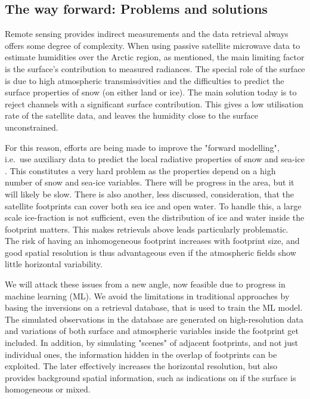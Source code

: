 \documentclass[12pt,oneside,a4paper]{article}
\begin{document}
\subsection{The way forward: Problems and solutions }


Remote sensing provides indirect measurements and the data retrieval always offers some degree of complexity. When using passive satellite microwave data to estimate humidities over the Arctic region, as mentioned, the main limiting factor is the surface's contribution to measured radiances. The special role of the surface is due to high atmospheric transmissivities and the difficulties to predict the surface properties of snow (on either land or ice).
The main solution today is to reject channels with a significant surface
contribution. This gives a low utilisation rate of the satellite data, and
leaves the humidity close to the surface unconstrained.

For this reason, efforts are being made to improve the "forward modelling",
i.e.\ use auxiliary data to predict the local radiative properties of snow and
sea-ice \citep[e.g.][]{tonboe:2010:thesi}. This constitutes a very hard problem
as the properties depend on a high number of snow and sea-ice
variables. There will be progress in the area, but it will likely be slow.
There is also another, less discussed, consideration, that the satellite
footprints can cover both sea ice and open water. To handle this, a large scale
ice-fraction is not sufficient, even the distribution of ice and water inside
the footprint matters. This makes retrievals above leads particularly
problematic. The risk of having an inhomogeneous footprint increases with
footprint size, and good spatial resolution is thus advantageous even if the atmospheric fields show little horizontal variability.



We will attack these issues from a new angle, now feasible due to progress in
machine learning (ML). We avoid the limitations in traditional approaches by
basing the inversions on a retrieval database, that is used to train the ML
model. The simulated observations in the database are generated on
high-resolution data and variations of both surface and atmospheric variables
inside the footprint get included. In addition, by simulating "scenes" of
adjacent footprints, and not just individual ones, the information hidden in the overlap of footprints can be exploited. The later effectively increases the horizontal resolution, but also provides background spatial information, such as indications on if the surface is homogeneous or mixed.
\end{document}
